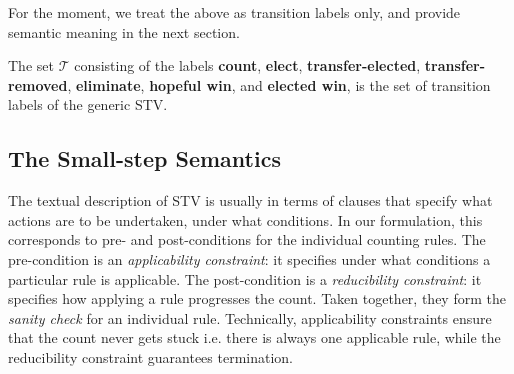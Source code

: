 \documentclass{llncs}
\begin{document}
\smallskip\noindent{}

\smallskip\noindent
For the moment, we treat the above as transition labels only, and
provide semantic meaning in the next section.

\begin{definition}\label{stv:trans}
The set $\mathcal{T}$ consisting of the labels \textbf{count}, \textbf{elect}, \textbf{transfer-elected}, \textbf{transfer-removed}, \textbf{eliminate}, \textbf{hopeful win}, and \textbf{elected win}, is the set of transition labels of the generic STV.
\end{definition}

\subsection{The Small-step Semantics}
The textual description of STV is usually in terms of clauses that
specify what actions are to be undertaken, under what conditions. In
our formulation, this corresponds to pre- and post-conditions for the
individual counting rules. The pre-condition is an
\emph{applicability constraint}: it specifies under what conditions
a particular rule is applicable. The post-condition is a
\emph{reducibility constraint}: it specifies how applying a rule
progresses the count.  Taken together, they form the \emph{sanity
check} for an individual rule. Technically, applicability
constraints ensure that the count never gets stuck i.e. there is
always one applicable rule, while the reducibility constraint guarantees termination. 
\end{document}
